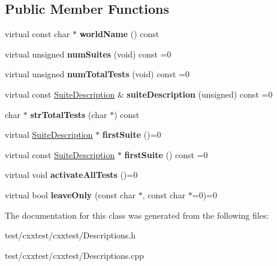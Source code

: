 \subsection*{Public Member Functions}
\begin{DoxyCompactItemize}
\item 
\hypertarget{classCxxTest_1_1WorldDescription_a1c0035dabce921e5fbb6cc88e98f6ff9}{virtual const char $\ast$ {\bfseries world\-Name} () const }\label{classCxxTest_1_1WorldDescription_a1c0035dabce921e5fbb6cc88e98f6ff9}

\item 
\hypertarget{classCxxTest_1_1WorldDescription_a525cc724abe3829196fe8cae148bb08d}{virtual unsigned {\bfseries num\-Suites} (void) const =0}\label{classCxxTest_1_1WorldDescription_a525cc724abe3829196fe8cae148bb08d}

\item 
\hypertarget{classCxxTest_1_1WorldDescription_ab79216449d209734acfcaf7f1c6d4846}{virtual unsigned {\bfseries num\-Total\-Tests} (void) const =0}\label{classCxxTest_1_1WorldDescription_ab79216449d209734acfcaf7f1c6d4846}

\item 
\hypertarget{classCxxTest_1_1WorldDescription_a17d3c470d2c5eab9a2dab8542914ff9f}{virtual const \hyperlink{classCxxTest_1_1SuiteDescription}{Suite\-Description} \& {\bfseries suite\-Description} (unsigned) const =0}\label{classCxxTest_1_1WorldDescription_a17d3c470d2c5eab9a2dab8542914ff9f}

\item 
\hypertarget{classCxxTest_1_1WorldDescription_a780f7dc4f29637dbbcc06d93d52963e5}{char $\ast$ {\bfseries str\-Total\-Tests} (char $\ast$) const }\label{classCxxTest_1_1WorldDescription_a780f7dc4f29637dbbcc06d93d52963e5}

\item 
\hypertarget{classCxxTest_1_1WorldDescription_a742d75a345bc7ff0ace6d48df6e64b59}{virtual \hyperlink{classCxxTest_1_1SuiteDescription}{Suite\-Description} $\ast$ {\bfseries first\-Suite} ()=0}\label{classCxxTest_1_1WorldDescription_a742d75a345bc7ff0ace6d48df6e64b59}

\item 
\hypertarget{classCxxTest_1_1WorldDescription_aab0c2fc965a9041ebfff872000db5636}{virtual const \hyperlink{classCxxTest_1_1SuiteDescription}{Suite\-Description} $\ast$ {\bfseries first\-Suite} () const =0}\label{classCxxTest_1_1WorldDescription_aab0c2fc965a9041ebfff872000db5636}

\item 
\hypertarget{classCxxTest_1_1WorldDescription_afb0a2e1994aecafa541f18737e5918a6}{virtual void {\bfseries activate\-All\-Tests} ()=0}\label{classCxxTest_1_1WorldDescription_afb0a2e1994aecafa541f18737e5918a6}

\item 
\hypertarget{classCxxTest_1_1WorldDescription_ab7d5d74e073d9326929b8b57ceb91502}{virtual bool {\bfseries leave\-Only} (const char $\ast$, const char $\ast$=0)=0}\label{classCxxTest_1_1WorldDescription_ab7d5d74e073d9326929b8b57ceb91502}

\end{DoxyCompactItemize}


The documentation for this class was generated from the following files\-:\begin{DoxyCompactItemize}
\item 
test/cxxtest/cxxtest/Descriptions.\-h\item 
test/cxxtest/cxxtest/Descriptions.\-cpp\end{DoxyCompactItemize}
